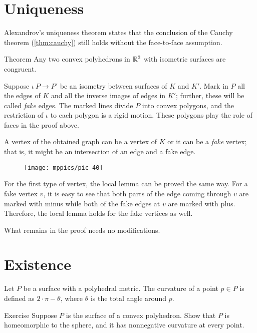 \section{Uniqueness}

Alexandrov's uniqueness theorem states that the conclusion of the Cauchy theorem (\ref{thm:cauchy}) still holds without the face-to-face assumption.

\begin{thm}{Theorem}\label{thm:alexandrov-uni'}
Any two convex polyhedrons in $\mathbb{R}^3$ with isometric surfaces are congruent.
\end{thm}

Suppose $\iota\:P\to P'$ be an isometry between surfaces of $K$ and $K'$.
Mark in $P$ all the edges of $K$ and all the inverse images of edges in $K'$; further, these will be called \emph{fake} edges.
The marked lines divide $P$ into convex polygons, and the restriction of $\iota$ to each polygon is a rigid motion.
These polygons play the role of faces in the proof above.

A vertex of the obtained graph can be a vertex of $K$ or it can be a \emph{fake} vertex;
that is, it might be an intersection of an edge and a fake edge.

\begin{figure}[ht!]
\vskip-0mm
\centering
\texttt{[image: mppics/pic-40]}
\vskip-0mm
\end{figure}

For the first type of vertex, the local lemma can be proved the same way. 
For a fake vertex $v$, it is easy to see that both parts of the edge coming through $v$ are marked with minus
while both of the fake edges at $v$ are marked with plus.
Therefore, the local lemma holds for the fake vertices as well.

What remains in the proof needs no modifications.
\qeds

\section{Existence}

Let $P$ be a surface with a polyhedral metric.
The curvature of a point $p\in P$ is defined as $2\cdot \pi -\theta$,
where $\theta$ is the total angle around $p$.

\begin{thm}{Exercise}\label{ex:sphere-with-pos}
Suppose $P$ is the surface of a convex polyhedron.
Show that $P$ is homeomorphic to the sphere, and it has nonnegative curvature at every point.
\end{thm}

